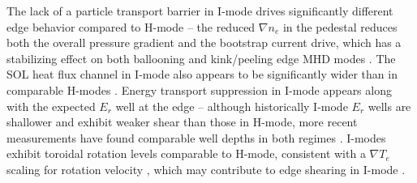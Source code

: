 \begin{figure}
 \pushtooutside
\end{figure}

The lack of a particle transport barrier in I-mode drives significantly different edge behavior compared to H-mode -- the reduced $\nabla n_e$ in the pedestal reduces both the overall pressure gradient and the bootstrap current drive, which has a stabilizing effect on both ballooning and kink/peeling edge MHD modes \cite{Hughes2013}.  The SOL heat flux channel in I-mode also appears to be significantly wider than in comparable H-modes \cite{Whyte2010,Hubbard2012b}.  Energy transport suppression in I-mode appears along with the expected $E_r$ well at the edge -- although historically I-mode $E_r$ wells are shallower and exhibit weaker shear than those in H-mode, more recent measurements have found comparable well depths in both regimes \cite{McDermott2009,Theiler2014}.  I-modes exhibit toroidal rotation levels comparable to H-mode, consistent with a $\nabla T_e$ scaling for rotation velocity \cite{Rice2011}, which may contribute to edge shearing in I-mode \cite{McDermott2009}.


